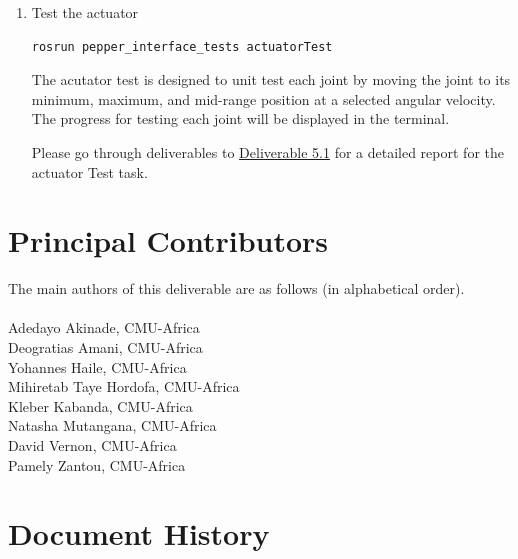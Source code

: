 \documentclass{CSSRforAfrica}
\newcommand{\blank}{~\\}
\begin{document}
{\begin{enumerate}
\item Test the actuator
\begin{lstlisting}[style=withoutNumbering, language=bash]
rosrun pepper_interface_tests actuatorTest
\end{lstlisting}
    
The acutator test is designed to unit test each joint by moving the joint to its minimum, maximum, and mid-range position at a selected angular velocity. The progress for testing each joint will be displayed in the terminal. 

Please go through deliverables to \href{https://cssr4africa.github.io/deliverables/CSSR4Africa_Deliverable_D5.1.pdf}
{Deliverable 5.1} for a detailed report for the actuator Test task.

\end{enumerate}

\newpage


\newpage

\section*{Principal Contributors}
\label{contributors}
The main authors of this deliverable are as follows (in alphabetical order).
\blank
~
\blank
Adedayo Akinade, CMU-Africa\\          %
Deogratias Amani, CMU-Africa\\  
Yohannes Haile, CMU-Africa\\ 
Mihiretab Taye Hordofa, CMU-Africa\\ 
Kleber Kabanda, CMU-Africa\\
Natasha Mutangana, CMU-Africa\\ 
David Vernon, CMU-Africa\\
Pamely Zantou, CMU-Africa\\ 

\pagebreak
\section*{Document History}
\label{document_history}

}
\end{document}
